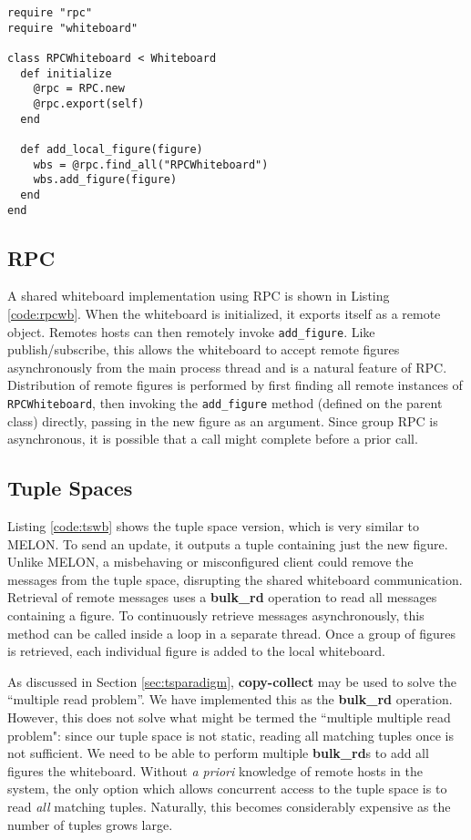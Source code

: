 \begin{lstlisting}[caption={RPC Whiteboard}, label={code:rpcwb}]
require "rpc"
require "whiteboard"

class RPCWhiteboard < Whiteboard
  def initialize
    @rpc = RPC.new
    @rpc.export(self)
  end

  def add_local_figure(figure)
    wbs = @rpc.find_all("RPCWhiteboard")
    wbs.add_figure(figure)
  end
end
\end{lstlisting}


\subsection{RPC}

A shared whiteboard implementation using RPC is shown in Listing \ref{code:rpcwb}. When the whiteboard is initialized, it exports itself as a remote object. Remotes hosts can then remotely invoke \texttt{add\_figure}. Like publish/subscribe, this allows the whiteboard to accept remote figures asynchronously from the main process thread and is a natural feature of RPC. Distribution of remote figures is performed by first finding all remote instances of \texttt{RPCWhiteboard}, then invoking the \texttt{add\_figure} method (defined on the parent class) directly, passing in the new figure as an argument. Since group RPC is asynchronous, it is possible that a call might complete before a prior call.

\subsection{Tuple Spaces}

Listing \ref{code:tswb} shows the tuple space version, which is very similar to MELON. To send an update, it outputs a tuple containing just the new figure. Unlike MELON, a misbehaving or misconfigured client could remove the messages from the tuple space, disrupting the shared whiteboard communication. Retrieval of remote messages uses a \textbf{bulk\_rd} operation to read all messages containing a figure. To continuously retrieve messages asynchronously, this method can be called inside a loop in a separate thread. Once a group of figures is retrieved, each individual figure is added to the local whiteboard. 

As discussed in Section \ref{sec:tsparadigm}, \textbf{copy-collect} may be used to solve the ``multiple read problem''. We have implemented this as the \textbf{bulk\_rd} operation. However, this does not solve what might be termed the ``multiple multiple read problem": since our tuple space is not static, reading all matching tuples once is not sufficient. We need to be able to perform multiple \textbf{bulk\_rd}s to add all figures the whiteboard. Without \textit{a priori} knowledge of remote hosts in the system, the only option which allows concurrent access to the tuple space is to read \textit{all} matching tuples. Naturally, this becomes considerably expensive as the number of tuples grows large.

